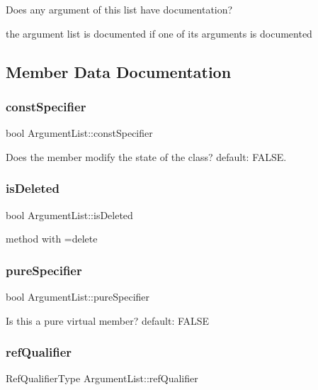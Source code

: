 Does any argument of this list have documentation?

the argument list is documented if one of its arguments is documented 

\subsection{Member Data Documentation}
\mbox{\label{class_argument_list_ae466c241240301ea30065310134ab639}} 
\subsubsection{\texorpdfstring{constSpecifier}{constSpecifier}}
{\footnotesize\ttfamily bool Argument\+List\+::const\+Specifier}

Does the member modify the state of the class? default\+: F\+A\+L\+SE. \mbox{\label{class_argument_list_a0fd4d40dd62fb9f798d99cb63f966183}} 
\subsubsection{\texorpdfstring{isDeleted}{isDeleted}}
{\footnotesize\ttfamily bool Argument\+List\+::is\+Deleted}

method with =delete \mbox{\label{class_argument_list_a3f023c090551e0ecaa588b25f895c047}} 
\subsubsection{\texorpdfstring{pureSpecifier}{pureSpecifier}}
{\footnotesize\ttfamily bool Argument\+List\+::pure\+Specifier}

Is this a pure virtual member? default\+: F\+A\+L\+SE \mbox{\label{class_argument_list_a007abb992ff51e8e205423ce9af1fce2}} 
\subsubsection{\texorpdfstring{refQualifier}{refQualifier}}
{\footnotesize\ttfamily Ref\+Qualifier\+Type Argument\+List\+::ref\+Qualifier}

